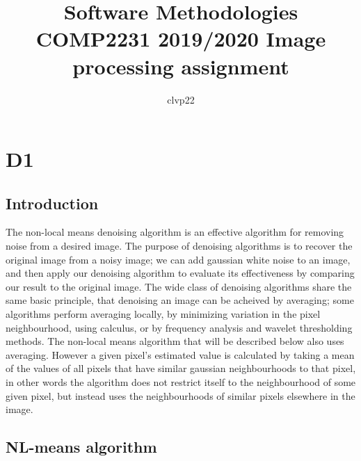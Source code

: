 \documentclass[fullpage]{article}
\title{Software Methodologies COMP2231 2019/2020 Image processing assignment}
\author{clvp22} %
\begin{document}
\maketitle
\section{D1}
\subsection{Introduction}

The non-local means denoising algorithm is an effective algorithm for removing noise from a desired image. The purpose of denoising algorithms is to recover the original image from a noisy image; we can add gaussian white noise to an image, and then apply our denoising algorithm to evaluate its effectiveness by comparing our result to the original image. The wide class of denoising algorithms share the same basic principle, that denoising an image can be acheived by averaging; some algorithms perform averaging locally, by minimizing variation in the pixel neighbourhood, using calculus, or by frequency analysis and wavelet thresholding methods. The non-local means algorithm that will be described below also uses averaging. However a given pixel’s estimated value is calculated by taking a mean of the values of all pixels that have similar gaussian neighbourhoods to that pixel, in other words the algorithm does not restrict itself to the neighbourhood of some given pixel, but instead uses the neighbourhoods of similar pixels elsewhere in the image.
\subsection{NL-means algorithm}
\end{document}
